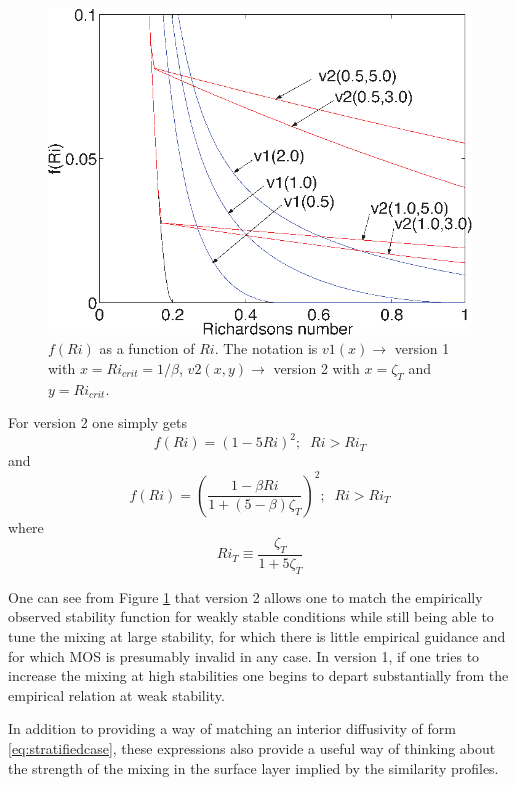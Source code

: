 \documentclass[12pt, letterpaper]{article}
\begin{document}
\begin{figure}[t]
  \centering
  \includegraphics{./monin_obukhov_v1vs2.eps}
  \caption{$f(Ri)$ as a function of $Ri$.  The notation is
    $v1(x)\rightarrow$ version 1 with $x=Ri_{crit}=1/\beta$, $v2(x,y)
    \rightarrow$ version 2 with $x = \zeta_T$ and $y=Ri_{crit}$.}
  \label{fig:f1}
\end{figure}

For version 2 one simply gets
\begin{equation}
  f(Ri) = (1-5Ri)^2;\;\;Ri>Ri_T
\end{equation}
and
\begin{equation}
  f(Ri) = \left(\frac{1-\beta Ri}{1+(5-\beta)\zeta_T}\right)^2;\;\;Ri>Ri_T
\end{equation}
where
\begin{equation}
  Ri_T \equiv \frac{\zeta_T}{1+5\zeta_T}
\end{equation}

One can see from Figure \ref{fig:f1} that version 2 allows one to
match the empirically observed stability function for weakly stable
conditions while still being able to tune the mixing at large
stability, for which there is little empirical guidance and for which
MOS is presumably invalid in any case.  In version 1, if one tries to
increase the mixing at high stabilities one begins to depart
substantially from the empirical relation at weak stability.

In addition to providing a way of matching an interior diffusivity of
form \eqref{eq:stratifiedcase}, these expressions also provide a
useful way of thinking about the strength of the mixing in the surface
layer implied by the similarity profiles.
\end{document}
